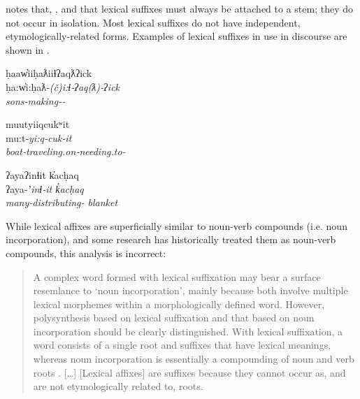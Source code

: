 \noindent \textcite[18]{Nakayama2001} notes that, , and that lexical suffixes must always be attached to a stem; they do not occur in isolation. Most lexical suffixes do not have independent, etymologically-related forms. Examples of lexical suffixes in use in discourse are shown in .

\begin{exe}

  \ex\label{ex:3.6}

  \begin{xlist}

    \ex\label{ex:3.6a}
    \glll ḥaaw̓iiḥaƛiiɬʔaqƛʔick\\
          ḥa:w̓i:ḥaƛ‑\em{(č)i:ɬ}‑ʔaq(ƛ)‑ʔick\\
          sons‑\em{making}‑‑\\

    \ex\label{ex:3.6b}
    \glll muutyiiqcukʷit\\
          mu:t‑\em{yi:q}‑cuk‑it\\
          boat‑\em{traveling.on}‑needing.to‑\\

    \ex\label{ex:3.6c}
    \glll ʔayaʔinɬit k̓acḥaq\\
          ʔaya‑\em{ʼinɬ}‑it                k̓acḥaq\\
          many‑\em{distributing}‑ blanket\\

  \end{xlist}

\end{exe}

\noindent While lexical affixes are superficially similar to noun-verb compounds (i.e. noun incorporation), and some research has historically treated them as noun-verb compounds, this analysis is incorrect:

\blockquote[{\cite[18]{Nakayama2001}}]{A complex word formed with lexical suffixation may bear a surface resemlance to \enquote*{noun incorporation}, mainly because both involve multiple lexical morphemes within a morphologically defined word. However, polysynthesis based on lexical suffixation and that based on noun incorporation should be clearly distinguished. With lexical suffixation, a word consists of a single root and suffixes that have lexical meanings, whereas noun incorporation is essentially a compounding of noun and verb roots . […] [Lexical affixes] are suffixes because they cannot occur as, and are not etymologically related to, roots.}

